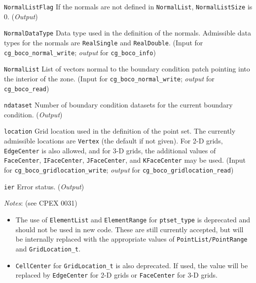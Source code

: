 \begin{Ventryi}{\texttt{NormalListFlag}}
      If the normals are not defined in \texttt{NormalList},
      \texttt{NormalListSize} is 0.
      (\textcolor{output}{\textit{Output}})
\item [\texttt{NormalDataType}]
      Data type used in the definition of the normals.
      Admissible data types for the normals are \texttt{RealSingle} and
      \texttt{RealDouble}.
      (\textcolor{input}{Input} for \texttt{cg\_boco\_normal\_write};
      \textcolor{output}{\textit{output}} for \texttt{cg\_boco\_info})
\item [\texttt{NormalList}]
      List of vectors normal to the boundary condition patch pointing
      into the interior of the zone.
      (\textcolor{input}{Input} for \texttt{cg\_boco\_normal\_write};
      \textcolor{output}{\textit{output}} for \texttt{cg\_boco\_read})
\item [\texttt{ndataset}]
      Number of boundary condition datasets for the current boundary
      condition.
      (\textcolor{output}{\textit{Output}})
\item [\texttt{location}]
      Grid location used in the definition of the point set.
      The currently admissible locations are \texttt{Vertex} (the default
      if not given). For 2-D grids, \texttt{EdgeCenter} is also allowed,
      and for 3-D grids, the additional values of \texttt{FaceCenter},
      \texttt{IFaceCenter}, \texttt{JFaceCenter}, and
      \texttt{KFaceCenter} may be used.
      (\textcolor{input}{Input} for \texttt{cg\_boco\_gridlocation\_write};
      \textcolor{output}{\textit{output}} for
      \texttt{cg\_boco\_gridlocation\_read})
\item [\texttt{ier}]
      Error status.
      (\textcolor{output}{\textit{Output}})
\end{Ventryi}

\noindent
\textit{Notes}: (see CPEX 0031)
\begin{itemize}
\item The use of \texttt{ElementList} and \texttt{ElementRange} for
      \texttt{ptset\_type} is deprecated and should not be used
      in new code. These are still currently accepted, but will be internally
      replaced with the appropriate values of \texttt{PointList/PointRange}
      and \texttt{GridLocation\_t}.
\item \texttt{CellCenter} for \texttt{GridLocation\_t} is also deprecated.
      If used, the value will be replaced by \texttt{EdgeCenter} for
      2-D grids or \texttt{FaceCenter} for 3-D grids.
\end{itemize}

